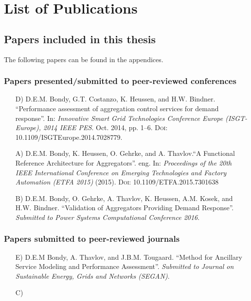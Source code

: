 \chapter{List of Publications}
\section*{Papers included in this thesis}
The following papers can be found in the appendices.
\subsection*{Papers presented/submitted to peer-reviewed conferences}
\begin{itemize}
	\item[D)] D.E.M. Bondy, G.T. Costanzo, K. Heussen, and H.W. Bindner. ``Performance assessment of aggregation control services for demand response''. In: \emph{Innovative Smart Grid Technologies Conference Europe (ISGT-Europe), 2014 IEEE PES}. Oct. 2014, pp. 1–6. \textsc{Doi}: 10.1109/ISGTEurope.2014.7028779.
	\item[A)] D.E.M. Bondy, K. Heussen, O. Gehrke, and A. Thavlov.``A Functional Reference Architecture for Aggregators''. eng. In: \emph{Proceedings of the 20th IEEE International Conference on Emerging Technologies and Factory Automation (ETFA 2015)} (2015). \textsc{Doi}: 10.1109/ETFA.2015.7301638
	\item[B)] D.E.M. Bondy, O. Gehrke, A. Thavlov, K. Heussen, A.M. Kosek, and H.W. Bindner. ``Validation of Aggregators Providing Demand Response''. \emph{Submitted to Power Systems Computational Conference 2016}.
\end{itemize}

\subsection*{Papers submitted to peer-reviewed journals}
\begin{itemize}
	\item[E)] D.E.M Bondy, A. Thavlov, and J.B.M. Tougaard. ``Method for Ancillary Service Modeling and Performance Assessment''. \emph{Submitted to Journal on Sustainable Energy, Grids and Networks (SEGAN)}.
	\item[C)] 
\end{itemize}

